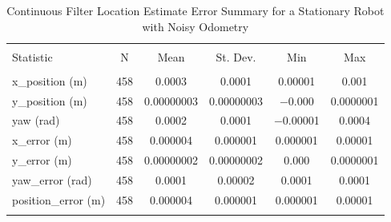 
\begin{table}[htbp] \centering 
  \caption{Continuous Filter Location Estimate Error Summary for a Stationary Robot with Noisy Odometry} 
  \label{tab:one_stationary_continuous_summary} 
\begin{tabular}{@{\extracolsep{5pt}}lccccc} 
\\[-1.8ex]\hline 
\hline \\[-1.8ex] 
Statistic & \multicolumn{1}{c}{N} & \multicolumn{1}{c}{Mean} & \multicolumn{1}{c}{St. Dev.} & \multicolumn{1}{c}{Min} & \multicolumn{1}{c}{Max} \\ 
\hline \\[-1.8ex] 
x\_position (m) & 458 & \num{0.0003} & \num{0.0001} & \num{0.00001} & \num{0.001} \\ 
y\_position (m) & 458 & \num{0.00000003} & \num{0.00000003} & \num{-0.000} & \num{0.0000001} \\ 
yaw (rad) & 458 & \num{0.0002} & \num{0.0001} & \num{-0.00001} & \num{0.0004} \\ 
x\_error (m) & 458 & \num{0.000004} & \num{0.000001} & \num{0.000001} & \num{0.00001} \\ 
y\_error (m) & 458 & \num{0.00000002} & \num{0.00000002} & \num{0.000} & \num{0.0000001} \\ 
yaw\_error (rad) & 458 & \num{0.0001} & \num{0.00002} & \num{0.0001} & \num{0.0001} \\ 
position\_error (m) & 458 & \num{0.000004} & \num{0.000001} & \num{0.000001} & \num{0.00001} \\ 
\hline \\[-1.8ex] 
\end{tabular} 
\end{table} 
